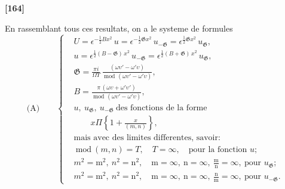 \documentclass[11pt,a4paper]{book}
\providecommand{\modd}{\ \mathrm{mod}\ }
\begin{document}
\textbf{[164]}

En rassemblant tous ces resultats, on a le systeme de formules
\begin{equation*}
\text{(A)}\qquad
\left\{
\begin{aligned}
&U = \epsilon^{-\frac{1}{2}Bx^2}\, u = \epsilon^{-\frac{1}{2}\mathfrak{G}x^2}\, u_{-\mathfrak{G}} = \epsilon^{\frac{1}{2}\mathfrak{G}x^2}\, u_{\mathfrak{G}},\\
&u = \epsilon^{\frac{1}{2}(B-\mathfrak{G})\, x^2}\, u_{-\mathfrak{G}} = \epsilon^{\frac{1}{2}(B+\mathfrak{G})\, x^2}\, u_{\mathfrak{G}},\\
&\mathfrak{G} = \frac{\pi i}{\Omega\Upsilon}\, \frac{(\omega\upsilon' - \omega'\upsilon)}{\modd\, (\omega\upsilon' - \omega'\upsilon)},\\
&B = \frac{\pi\, (\omega\upsilon + \omega'\upsilon')}{\modd\, (\omega\upsilon' - \omega'\upsilon)},\\
&u,\ u_{\mathfrak{G}},\ u_{-\mathfrak{G}}\ \text{des fonctions de la forme}\\
&\qquad x\Pi \left\{1 + \frac{x}{(m, n)}\right\},\\
&\text{mais avec des limites differentes, savoir:}\\
&\modd(m, n) = T,\quad T = \infty,\quad \text{pour la fonction $u$};\\
&m^2 = \mathrm{m}^2,\ n^2 = \mathrm{n}^2,\quad \mathrm{m} = \infty,\ \mathrm{n} = \infty,\ \frac{\mathrm{m}}{\mathrm{n}} = \infty,\ \text{pour $u_{\mathfrak{G}}$};\\
&m^2 = \mathrm{m}^2,\ n^2 = \mathrm{n}^2,\quad \mathrm{m} = \infty,\ \mathrm{n} = \infty,\ \frac{\mathrm{n}}{\mathrm{m}} = \infty,\ \text{pour $u_{-\mathfrak{G}}$.}
\end{aligned}
\right.
\end{equation*}
\end{document}
